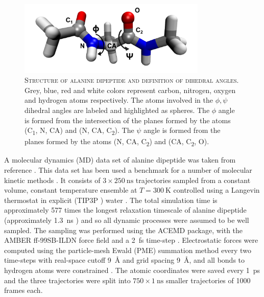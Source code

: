 \begin{figure}
    \centering
    \includegraphics[width=0.8\textwidth]{chapters/msm_optimization/figures/phi_psi_ala-dp.png}
    \caption[Structure of alanine dipeptide and definition of dihedral angles]{\textsc{Structure of alanine dipeptide and definition of dihedral angles}. Grey, blue, red and white colors represent carbon, nitrogen, oxygen and hydrogen atoms respectively. The atoms involved in the $\phi, \psi$ dihedral angles are labeled and highlighted as spheres.  The $\phi$ angle is formed from the intersection of the planes formed by the atoms (C\textsubscript{1}, N, CA) and (N, CA, C\textsubscript{2}).  The $\psi$ angle is formed from the planes formed by the atoms (N, CA, C\textsubscript{2}) and (CA, C\textsubscript{2}, O).}
    \label{fig:ala1_structure}
\end{figure}

A molecular dynamics (MD) data set  of alanine dipeptide was taken from reference \cite{nuskeMarkovStateModels2017b}. This data set has been used a benchmark for a number of molecular kinetic methods \cite{wehmeyerTimelaggedAutoencodersDeep2018a, nuskeMarkovStateModels2017b, nuskeCoarsegrainingMolecularSystems2019, wangMachineLearningCoarseGrained2019, liNeuralCanonicalTransformation2020, varolgunesInterpretableEmbeddingsMolecular2020, nuskeSpectralPropertiesEffective2021, sechiEstimationKoopmanGenerator2021, mardtVAMPnetsDeepLearning2018}. It consists of $3\times \SI{250}{\nano\second}$ trajectories sampled from a constant volume, constant temperature ensemble at $T=\SI{300}{\kelvin}$ controlled using a Langevin thermostat in explicit (TIP3P \cite{jorgensen1983comparison}) water \cite{nuskeMarkovStateModels2017b}. The total simulation time is approximately 577 times the longest relaxation timescale of alanine dipeptide  (approximately \SI{1.3}{\nano\second} \cite{bolhuis2000reaction}) and so all dynamic processes were assumed to be well sampled. The sampling was performed using the ACEMD \cite{harveyACEMDAcceleratingBiomolecular2009} package, with the AMBER ff-99SB-ILDN \cite{lindorff-larsenImprovedSidechainTorsion2010} force field and a \SI{2}{\femto\second} time-step \cite{nuskeMarkovStateModels2017b}. Electrostatic forces were computed using the particle-mesh Ewald (PME) \cite{dardenParticleMeshEwald1993} summation method every two time-steps with  real-space cutoff \SI{9}{\angstrom} and grid spacing \SI{9}{\angstrom}, and all bonds to hydrogen atoms were constrained \cite{nuskeMarkovStateModels2017b}. The atomic coordinates were saved every \SI{1}{\pico\second} and the three trajectories were split into $750\times\SI{1}{\nano\second}$ smaller trajectories of \num{1000} frames each. 



